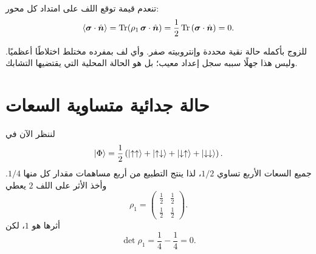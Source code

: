تنعدم قيمة توقع اللف على امتداد كل محور:
\begin{equation}
\left\langle\bm{\sigma}\cdot\hat{\bm n}\right\rangle
=\operatorname{Tr}\!\left(
\rho_1\,\bm{\sigma}\cdot\hat{\bm n}
\right)
=\frac12\operatorname{Tr}
\left(\bm{\sigma}\cdot\hat{\bm n}\right)
=0.
\end{equation}

\begin{classroomqa}
\end{classroomqa}

للزوج بأكمله حالة نقية محددة وإنتروبيته صفر. وأي لف بمفرده مختلط اختلاطًا أعظميًا. وليس هذا جهلًا سببه سجل إعداد معيب؛ بل هو الحالة المحلية التي يقتضيها التشابك.

\section{حالة جدائية متساوية السعات}

لننظر الآن في
\begin{equation}
\left\lvert\Phi\right\rangle
=\frac12\left(
\left\lvert\uparrow\uparrow\right\rangle
+\left\lvert\uparrow\downarrow\right\rangle
+\left\lvert\downarrow\uparrow\right\rangle
+\left\lvert\downarrow\downarrow\right\rangle
\right).
\end{equation}
جميع السعات الأربع تساوي \(1/2\)، لذا ينتج التطبيع من أربع مساهمات مقدار كل منها \(1/4\). وأخذ الأثر على اللف \(2\) يعطي
\begin{equation}
\rho_1
=
\begin{pmatrix}
\frac12&\frac12\\[2pt]
\frac12&\frac12
\end{pmatrix}.
\end{equation}
أثرها هو \(1\)، لكن
\begin{equation}
\det\rho_1
=\frac14-\frac14
=0.
\end{equation}

\begin{classroomqa}
\end{classroomqa}

